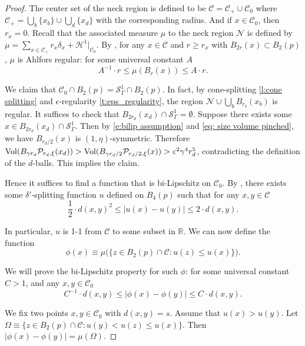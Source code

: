 \documentclass[11pt,reqno]{amsart}
\numberwithin{equation}{section}
\newcommand{\RR}{\mathds{R}}
\newcommand{\Vol}{{\rm Vol}}
\newcommand{\cC}{\mathcal{C}}
\newcommand{\cH}{\mathcal{H}}
\newcommand{\cN}{\mathcal{N}}
\newcommand{\cP}{\mathcal{P}}
\newcommand{\cS}{\mathcal{S}}
\theoremstyle{definition}
\theoremstyle{remark}
\begin{document}
\begin{proof}
The center set of the neck region is defined to be $\cC=\cC_+ \cup \cC_0$ where $\cC_+ = \bigcup_b \{x_b\} \cup \bigcup_d\{x_d\}$ with the corresponding radius. And if $x\in \cC_0$, then $r_x = 0$. 
Recall that the associated measure $\mu$ to the neck region $\cN$ is defined by $\mu = \sum_{x\in \cC_+} r_x \delta_x + \cH^1|_{\cC_0}$. By \cite[Theorem 2.9]{cjn}, for any $x \in \cC$ and $r\ge r_x$ with $B_{2r}(x) \subset B_2(p)$, $\mu$ is Ahlfors regular: for some universal constant $A$
\begin{equation}\label{e:ahlfors}
    A^{-1} \cdot r \le \mu(B_r(x)) \le A \cdot r.
\end{equation}

We claim that $\cC_0 \cap B_2(p) = \cS^1_{\Gamma} \cap B_2(p)$. In fact, by cone-splitting \ref{l:cone splitting} and $\epsilon$-regularity \ref{t:eps_regularity}, the region $\cN \cup \bigcup_b B_{r_b}(x_b)$ is regular. It suffices to check that $B_{2r_d}(x_d)\cap \cS^1_{\Gamma}=\emptyset$. Suppose there exists some $x\in B_{2r_d}(x_d)\cap \cS^1_{\Gamma}$. Then by \eqref{e:bilip assumption} and \eqref{eq: size volume pinched}, we have $B_{r_d/2}(x)$ is $(1,\eta)$-symmetric. Therefore $\Vol(B_{\gamma r_d}\cP_{r_d,\xi}(x_d)) > \Vol(B_{\gamma r_d/2}\cP_{r_d/2,\xi}(x))>\varepsilon^2 \gamma^4r_d^5$, contradicting the definition of the $d$-balls.  This implies the claim.

Hence it suffices to find a function that is bi-Lipschitz on $\cC_0$. By \cite[Proposition 9.3]{cjn}, there exists some $\delta'$-splitting function $u$ defined on $B_4(p)$ such that for any $x,y\in \cC$
\begin{equation*}
    \frac{1}{2}\cdot d(x,y)^{2} \le |u(x) - u(y) | \le 2\cdot d(x,y).
\end{equation*}

In particular, $u$ is 1-1 from $\cC$ to some subset in $\RR$. We can now define the function
\begin{equation*}
    \phi(x) \equiv \mu\Big( \{z\in B_2(p) \cap \cC :u(z) \le u(x)\} \Big).
\end{equation*}

We will prove the bi-Lipschitz property for such $\phi$: for some universal constant $C>1$, and any $x,y\in \cC_0$
\begin{equation*}
    C^{-1} \cdot d(x,y) \le |\phi(x) - \phi(y) | \le C \cdot d(x,y).
\end{equation*}

We fix two points $x,y \in \cC_0$ with $d(x,y)=s$. Assume that $u(x)>u(y)$.
Let $\Omega \equiv \{z\in B_2(p) \cap \cC: u(y) < u(z) \le u(x) \}$. Then $|\phi(x) - \phi(y)| = \mu(\Omega)$.


\end{proof}
\end{document}
